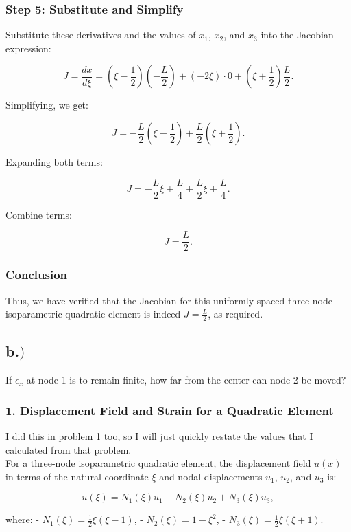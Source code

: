\documentclass{article}
\begin{document}
\subsubsection*{Step 5: Substitute and Simplify}
Substitute these derivatives and the values of \( x_1 \), \( x_2 \), and \( x_3 \) into the Jacobian expression:

\[
J = \frac{dx}{d\xi} = \left(\xi - \frac{1}{2}\right) \left(-\frac{L}{2}\right) + (-2\xi) \cdot 0 + \left(\xi + \frac{1}{2}\right) \frac{L}{2}.
\]

Simplifying, we get:

\[
J = -\frac{L}{2} \left(\xi - \frac{1}{2}\right) + \frac{L}{2} \left(\xi + \frac{1}{2}\right).
\]

Expanding both terms:

\[
J = -\frac{L}{2} \xi + \frac{L}{4} + \frac{L}{2} \xi + \frac{L}{4}.
\]

Combine terms:

\[
J = \frac{L}{2}.
\]

\subsubsection*{Conclusion}
Thus, we have verified that the Jacobian for this uniformly spaced three-node isoparametric quadratic element is indeed \( J = \frac{L}{2} \), as required.

\newpage
\subsection*{b.$)$}
If \( \epsilon_x \) at node 1 is to remain finite, how far from the center can node 2 be moved?


\subsubsection*{1. Displacement Field and Strain for a Quadratic Element}
I did this in problem 1 too, so I will just quickly restate the values that I calculated from that problem.\\

For a three-node isoparametric quadratic element, the displacement field \( u(x) \) in terms of the natural coordinate \( \xi \) and nodal displacements \( u_1 \), \( u_2 \), and \( u_3 \) is:

\[
u(\xi) = N_1(\xi) u_1 + N_2(\xi) u_2 + N_3(\xi) u_3,
\]

where:
- \( N_1(\xi) = \frac{1}{2} \xi (\xi - 1) \),
- \( N_2(\xi) = 1 - \xi^2 \),
- \( N_3(\xi) = \frac{1}{2} \xi (\xi + 1) \).
\end{document}
